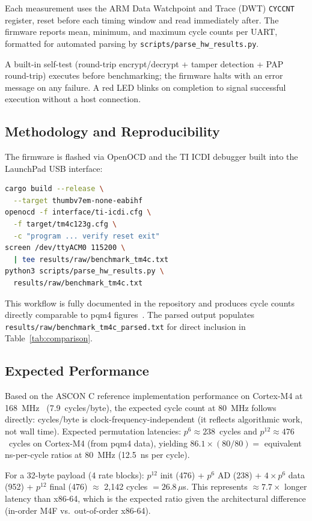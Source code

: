 \documentclass[anonymous]{ndss}
\begin{document}
Each measurement uses the ARM Data Watchpoint and Trace (DWT)
\texttt{CYCCNT} register, reset before each timing window and read
immediately after. The firmware reports mean, minimum, and maximum
cycle counts per UART, formatted for automated parsing by
\texttt{scripts/parse\_hw\_results.py}.

A built-in self-test (round-trip encrypt/decrypt + tamper detection
+ PAP round-trip) executes before benchmarking; the firmware halts
with an error message on any failure. A red LED blinks on completion
to signal successful execution without a host connection.

\subsection{Methodology and Reproducibility}

The firmware is flashed via OpenOCD and the TI ICDI debugger built
into the LaunchPad USB interface:
\begin{lstlisting}[language=bash]
cargo build --release \
  --target thumbv7em-none-eabihf
openocd -f interface/ti-icdi.cfg \
  -f target/tm4c123g.cfg \
  -c "program ... verify reset exit"
screen /dev/ttyACM0 115200 \
  | tee results/raw/benchmark_tm4c.txt
python3 scripts/parse_hw_results.py \
  results/raw/benchmark_tm4c.txt
\end{lstlisting}

This workflow is fully documented in the repository and produces
cycle counts directly comparable to pqm4 figures~\cite{b10}.
The parsed output populates \texttt{results/raw/benchmark\_tm4c\_parsed.txt}
for direct inclusion in Table~\ref{tab:comparison}.

\subsection{Expected Performance}

Based on the ASCON C reference implementation performance on Cortex-M4
at 168~MHz~\cite{b10} (7.9~cycles/byte), the expected cycle count at
80~MHz follows directly: cycles/byte is clock-frequency-independent
(it reflects algorithmic work, not wall time). Expected permutation
latencies: $p^6 \approx 238$~cycles and $p^{12} \approx 476$~cycles
on Cortex-M4 (from pqm4 data), yielding
$86.1\times(80/80)=$ equivalent ns-per-cycle ratios at 80~MHz
(12.5~ns per cycle).

For a 32-byte payload (4 rate blocks):
$p^{12}$ init (476) + $p^6$ AD (238) + $4\times p^6$ data (952) +
$p^{12}$ final (476) $\approx$ 2{,}142 cycles $= 26.8\,\mu$s.
This represents $\approx 7.7\times$ longer latency than x86-64,
which is the expected ratio given the architectural difference
(in-order M4F vs.\ out-of-order x86-64).
\end{document}
